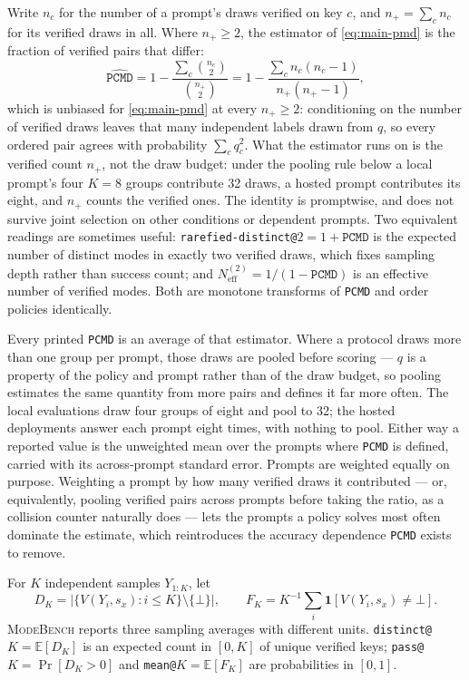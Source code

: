 \documentclass{article}
\newcommand{\1}{\mathbf 1}
\newcommand{\E}{\mathbb E}
\newcommand{\mb}{\textsc{ModeBench}}
\newcommand{\pmd}{\texttt{PCMD}}
\newcommand{\neff}{\ensuremath{N^{(2)}_{\mathrm{eff}}}}
\theoremstyle{remark}
\theoremstyle{definition}
\theoremstyle{plain}
\begin{document}
Write $n_c$ for the number of a prompt's draws verified on key $c$, and
$n_+=\sum_c n_c$ for its verified draws in all. Where $n_+\ge2$, the estimator
of \eqref{eq:main-pmd} is the fraction of verified pairs that differ:
\begin{equation}
 \widehat{\pmd}
 =1-\frac{\sum_c \binom{n_c}{2}}{\binom{n_+}{2}}
 =1-\frac{\sum_c n_c(n_c-1)}{n_+(n_+-1)},
 \label{eq:main-pmd-estimator}
\end{equation}
which is unbiased for \eqref{eq:main-pmd} at every $n_+\ge2$: conditioning on
the number of verified draws leaves that many independent labels drawn from
$q$, so every ordered pair agrees with probability $\sum_c q_c^2$. What the
estimator runs on is the verified count $n_+$, not the draw budget: under the
pooling rule below a local prompt's four $K=8$ groups contribute 32 draws, a
hosted prompt contributes its eight, and $n_+$ counts the verified ones. The
identity is promptwise, and does not survive joint selection on other
conditions or dependent prompts. Two equivalent readings are sometimes useful:
\texttt{rarefied-distinct@}$2=1+\pmd$ is the expected number of distinct modes
in exactly two verified draws, which fixes sampling depth rather than success
count; and $\neff=1/(1-\pmd)$ is an effective number of verified modes. Both
are monotone transforms of \pmd{} and order policies identically.

Every printed \pmd{} is an average of that estimator. Where a protocol draws
more than one group per prompt, those draws are pooled before scoring --- $q$
is a property of the policy and prompt rather than of the draw budget, so
pooling estimates the same quantity from more pairs and defines it far more
often. The local evaluations draw four groups of eight and pool to 32; the
hosted deployments answer each prompt eight times, with nothing to pool. Either
way a reported value is the unweighted mean over the prompts where \pmd{} is
defined, carried with its across-prompt standard error. Prompts are weighted
equally on purpose. Weighting a prompt by how many verified draws it
contributed --- or, equivalently, pooling verified pairs across prompts before
taking the ratio, as a collision counter naturally does --- lets the prompts a
policy solves most often dominate the estimate, which reintroduces the accuracy
dependence \pmd{} exists to remove.

For $K$ independent samples $Y_{1:K}$, let
\[
  D_K=\bigl|\{V(Y_i,s_x):i\le K\}\setminus\{\bot\}\bigr|,
  \qquad
  F_K=K^{-1}\sum_i \1[V(Y_i,s_x)\neq\bot].
\]
\mb{} reports three sampling averages with different units. \texttt{distinct@}$K
=\E[D_K]$ is an expected count in $[0,K]$ of unique verified keys;
\texttt{pass@}$K=\Pr[D_K>0]$ and \texttt{mean@}$K=\E[F_K]$ are probabilities
in $[0,1]$.
\end{document}
